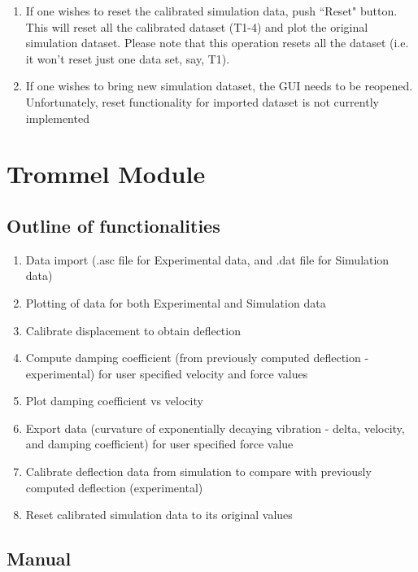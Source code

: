 \documentclass[12pt]{article}
\begin{document}
\begin{enumerate}
        \item   If one wishes to reset the calibrated simulation data, push ``Reset"
    button. This will reset all the calibrated dataset (T1-4) and plot the original
    simulation dataset. Please note that this operation resets all the dataset
    (i.e. it won't reset just one data set, say, T1). 
        
        \item   If one wishes to bring new simulation dataset, the GUI needs to be
    reopened. Unfortunately, reset functionality for imported dataset is not
    currently implemented

    \end{enumerate}


\section{Trommel Module}\label{Trommel}

\subsection{Outline of functionalities}

    \begin{enumerate}

        \item   Data import (.asc file for Experimental data, and .dat file for Simulation data)
        \item   Plotting of data for both Experimental and Simulation data
        \item   Calibrate displacement to obtain deflection
        \item   Compute damping coefficient (from previously computed deflection - experimental) for user specified velocity and force values
        \item   Plot damping coefficient vs velocity
        \item   Export data (curvature of exponentially decaying vibration - delta, velocity, and damping coefficient) for user specified force value
        \item   Calibrate deflection data from simulation to compare with previously computed deflection (experimental)
        \item   Reset calibrated simulation data to its original values

    \end{enumerate}

\subsection{Manual}
\end{document}
